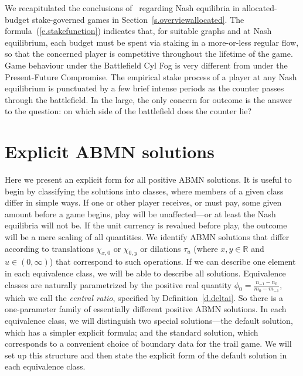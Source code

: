 \documentclass[letterpaper,11pt,oneside,reqno]{amsbook}
\newcommand{\R}{\ensuremath{\mathbb{R}}}
\newcommand{\Z}{\ensuremath{\mathbb{Z}}}
\numberwithin{figure}{chapter}
\theoremstyle{definition}
\theoremstyle{definition}
\theoremstyle{definition}
\theoremstyle{definition}
\theoremstyle{definition}
\newcommand{\transmap}{\chi}
\newcommand{\abmnmacspace}{\textrm{ABMN} }
\begin{document}
 We recapitulated the conclusions of~\cite{HP2022} regarding Nash equilibria in allocated-budget stake-governed games in Section~\ref{s.overviewallocated}. The formula~(\ref{e.stakefunction})  indicates that, for suitable graphs 
 and at Nash equilibrium, each budget must be spent via staking in a more-or-less regular flow, so that the concerned player is competitive throughout the lifetime of the game. 
 Game behaviour under the Battlefield Cyl Fog is very different from under the Present-Future Compromise.
 The empirical stake process of a player at any Nash equilibrium is punctuated by a few brief intense periods as the counter passes through the battlefield. In the large, the only concern for outcome is the answer to the question: on which side of the battlefield does the counter lie? 
 
 
  \section{Explicit \abmnmacspace solutions}\label{s.solvingabmn}

Here we present an explicit form for all positive \abmnmacspace solutions. It is useful to begin by classifying the solutions into classes, where members of a given class differ in simple ways. If one or other player receives, or must pay, some given amount before a game begins, play will be unaffected---or at least the Nash equilibria will not be. If the unit currency is revalued before play, the outcome will be a mere scaling of all quantities. We identify \abmnmacspace solutions that differ according to translations $\transmap_{x,0}$ or $\transmap_{0,y}$ or dilations $\tau_u$ (where $x,y \in \R$ and $u \in (0,\infty)$) that correspond to such operations. If we can describe one element in each equivalence class, we will be able to describe all solutions. Equivalence classes are naturally parametrized by the positive real quantity $\phi_0 = \tfrac{n_{-1}-n_0}{m_0 - m_{-1}}$, which we call the {\em central ratio}, specified by Definition~\ref{d.deltai}. So there is a one-parameter family of essentially different positive \abmnmacspace solutions. In each equivalence class, we will distinguish two special solutions---the default solution, which has a simpler explicit formula; and the standard solution, which corresponds to a convenient choice of boundary data for the trail game. We will set up this structure and then state the explicit form of the default solution in each equivalence class. 
\end{document}
